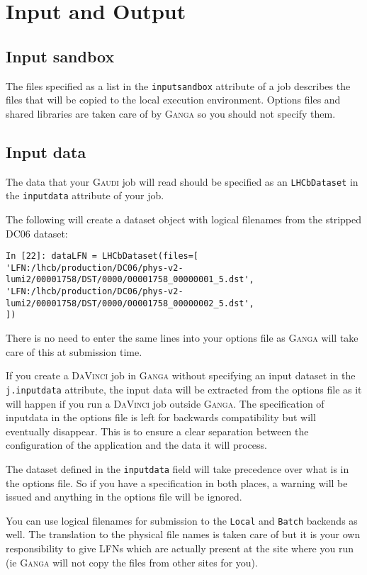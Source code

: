 \documentclass{howto}
\def\ganga {\textsc{Ganga}\xspace}
\def\gaudi {\textsc{Gaudi}\xspace}
\def\davinci {\textsc{DaVinci}\xspace}
\begin{document}
\section{Input and Output}
\label{sec:InOut}

\subsection{Input sandbox}
\label{sec:Inputsandbox}
The files specified as a list in the \texttt{inputsandbox} attribute of a job
describes the files that will be copied to the local execution environment.
Options files and shared libraries are taken care of by \ganga so you should
not specify them.

\subsection{Input data}
\label{sec:datasets}
The data that your \gaudi job will read should be specified as an
\texttt{LHCbDataset} in the \texttt{inputdata} attribute of your job.

The following will create a dataset object with logical filenames from the
stripped DC06 dataset:
\begin{verbatim}
In [22]: dataLFN = LHCbDataset(files=[
'LFN:/lhcb/production/DC06/phys-v2-lumi2/00001758/DST/0000/00001758_00000001_5.dst',
'LFN:/lhcb/production/DC06/phys-v2-lumi2/00001758/DST/0000/00001758_00000002_5.dst',
])
\end{verbatim}
There is no need to enter the same lines into your options file as \ganga will
take care of this at submission time.

If you create a \davinci job in \ganga without specifying an input dataset in
the \texttt{j.inputdata} attribute, the input data will be extracted from the
options file as it will happen if you run a \davinci job outside \ganga. The
specification of inputdata in the options file is left for backwards
compatibility but will eventually disappear. This is to ensure a clear
separation between the configuration of the application and the data it will
process.

\begin{notice}
  The dataset defined in the \texttt{inputdata} field will take precedence
  over what is in the options file. So if you have a specification in both
  places, a warning will be issued and anything in the options file will be
  ignored.
\end{notice}

You can use logical filenames for submission to the \texttt{Local} and
\texttt{Batch} backends as well. The translation to the physical file names is
taken care of but it is your own responsibility to give LFNs which are
actually present at the site where you run (ie \ganga will not copy the files
from other sites for you).
\end{document}
